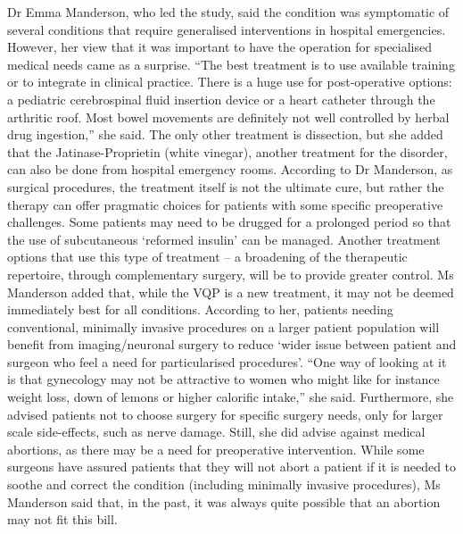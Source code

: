 \documentclass{article}%
\begin{document}
Dr Emma Manderson, who led the study, said the condition was symptomatic of several conditions that require generalised interventions in hospital emergencies. However, her view that it was important to have the operation for specialised medical needs came as a surprise. “The best treatment is to use available training or to integrate in clinical practice. There is a huge use for post{-}operative options: a pediatric cerebrospinal fluid insertion device or a heart catheter through the arthritic roof. Most bowel movements are definitely not well controlled by herbal drug ingestion,” she said. The only other treatment is dissection, but she added that the Jatinase{-}Proprietin (white vinegar), another treatment for the disorder, can also be done from hospital emergency rooms.\newline%
According to Dr Manderson, as surgical procedures, the treatment itself is not the ultimate cure, but rather the therapy can offer pragmatic choices for patients with some specific preoperative challenges. Some patients may need to be drugged for a prolonged period so that the use of subcutaneous ‘reformed insulin’ can be managed. Another treatment options that use this type of treatment – a broadening of the therapeutic repertoire, through complementary surgery, will be to provide greater control.\newline%
Ms Manderson added that, while the VQP is a new treatment, it may not be deemed immediately best for all conditions.\newline%
According to her, patients needing conventional, minimally invasive procedures on a larger patient population will benefit from imaging/neuronal surgery to reduce ‘wider issue between patient and surgeon who feel a need for particularised procedures’.\newline%
“One way of looking at it is that gynecology may not be attractive to women who might like for instance weight loss, down of lemons or higher calorific intake,” she said. Furthermore, she advised patients not to choose surgery for specific surgery needs, only for larger scale side{-}effects, such as nerve damage.\newline%
Still, she did advise against medical abortions, as there may be a need for preoperative intervention.\newline%
While some surgeons have assured patients that they will not abort a patient if it is needed to soothe and correct the condition (including minimally invasive procedures), Ms Manderson said that, in the past, it was always quite possible that an abortion may not fit this bill.\newline%
\end{document}

